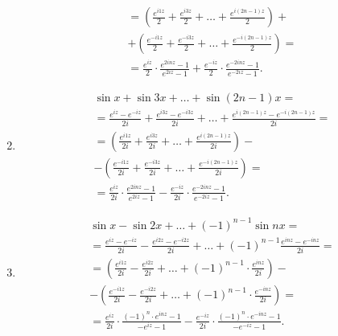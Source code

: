 \begin{solution}
\begin{enumerate}
\begin{multline*}
			= \left( \frac{e^{i1z}}{2} + \frac{e^{i3z}}{2} + \ldots + \frac{e^{i(2n-1)z}}{2} \right) + \\
			+ \left( \frac{e^{-i1z}}{2} + \frac{e^{-i3z}}{2} + \ldots + \frac{e^{-i(2n-1)z}}{2} \right) = \\
			= \frac{e^{iz}}{2} \cdot \frac{e^{2inz}-1}{e^{2iz}-1} + \frac{e^{-iz}}{2} \cdot \frac{e^{-2inz}-1}{e^{-2iz}-1}.
		\end{multline*}
		\item \begin{multline*}
			\sin x + \sin 3x + \ldots + \sin (2n - 1) x = \\
			= \frac{e^{iz} - e^{-iz}}{2i} + \frac{e^{i3z} - e^{-i3z}}{2i} + \ldots + \frac{e^{i(2n-1)z} - e^{-i(2n-1)z}}{2i} = \\
			= \left( \frac{e^{i1z}}{2i} + \frac{e^{i3z}}{2i} + \ldots + \frac{e^{i(2n-1)z}}{2i} \right) - \\
			- \left( \frac{e^{-i1z}}{2i} + \frac{e^{-i3z}}{2i} + \ldots + \frac{e^{-i(2n-1)z}}{2i} \right) = \\
			= \frac{e^{iz}}{2i} \cdot \frac{e^{2inz}-1}{e^{2iz}-1} - \frac{e^{-iz}}{2i} \cdot \frac{e^{-2inz}-1}{e^{-2iz}-1}.
		\end{multline*}
		\item \begin{multline*}
			\sin x - \sin 2x + \ldots + (-1)^{n-1} \sin nx = \\
			= \frac{e^{iz} - e^{-iz}}{2i} - \frac{e^{i2z} - e^{-i2z}}{2i} + \ldots + (-1)^{n-1} \frac{e^{inz} - e^{-inz}}{2i} = \\
			= \left( \frac{e^{i1z}}{2i} - \frac{e^{i2z}}{2i} + \ldots + (-1)^{n-1} \cdot \frac{e^{inz}}{2i} \right) - \\
			- \left( \frac{e^{-i1z}}{2i} - \frac{e^{-i2z}}{2i} + \ldots + (-1)^{n-1} \cdot \frac{e^{-inz}}{2i} \right) = \\
			= \frac{e^{iz}}{2i} \cdot \frac{(-1)^n \cdot e^{inz}-1}{- e^{iz} - 1} - \frac{e^{-iz}}{2i} \cdot \frac{(-1)^n \cdot e^{-inz}-1}{-e^{-iz}-1}.
		\end{multline*}
	\end{enumerate}
\end{solution}

